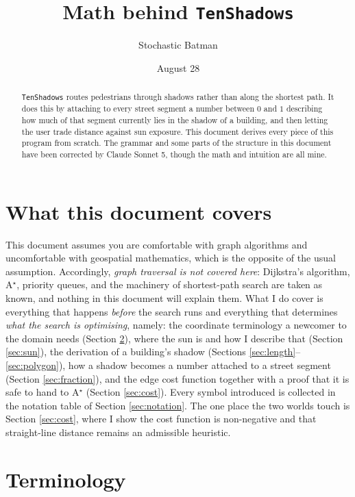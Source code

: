 \documentclass[11pt,a4paper]{article}
\title{Math behind \texttt{TenShadows}}
\author{Stochastic Batman}
\date{August 28}
\theoremstyle{plain}
\theoremstyle{definition}
\theoremstyle{remark}
\begin{document}
\maketitle

\begin{abstract}
\texttt{TenShadows} routes pedestrians through shadows rather than along the shortest path. It does this by attaching to every street segment a number between $0$ and $1$ describing how much of that segment currently lies in the shadow of a building, and then letting the user trade distance against sun exposure. This document derives every piece of this program from scratch. The grammar and some parts of the structure in this document have been corrected by Claude Sonnet 5, though the math and intuition are all mine.

\end{abstract}

\section{What this document covers}

This document assumes you are comfortable with graph algorithms and uncomfortable with geospatial mathematics, which is the opposite of the usual assumption. Accordingly, \emph{graph traversal is not covered here}: Dijkstra's algorithm, A$^\star$, priority queues, and the machinery of shortest-path search are taken as known, and nothing in this document will explain them. What I do cover is everything that happens \emph{before} the search runs and everything that determines \emph{what the search is optimising}, namely: the coordinate terminology a newcomer to the domain needs (Section \ref{sec:terms}), where the sun is and how I describe that (Section \ref{sec:sun}), the derivation of a building's shadow (Sections \ref{sec:length}--\ref{sec:polygon}), how a shadow becomes a number attached to a street segment (Section \ref{sec:fraction}), and the edge cost function together with a proof that it is safe to hand to A$^\star$ (Section \ref{sec:cost}). Every symbol introduced is collected in the notation table of Section \ref{sec:notation}. The one place the two worlds touch is Section \ref{sec:cost}, where I show the cost function is non-negative and that straight-line distance remains an admissible heuristic.

\section{Terminology}
\label{sec:terms}
\end{document}
